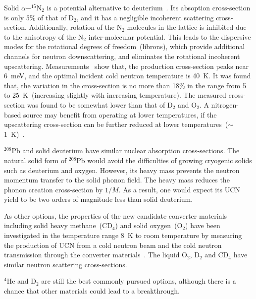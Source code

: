 Solid $\alpha - ^{15}$N$_2$ is a potential alternative to
deuterium~\cite{Salvat2013}. Its absoption cross-section is only 5\%
of that of D$_2$, and it has a negligible incoherent scattering
cross-section. Additionally, rotation of the N$_2$ molecules in the
lattice is inhibited due to the anisotropy of the N$_2$
inter-molecular potential. This leads to the dispersive modes for the
rotational degrees of freedom~(librons), which provide additional
channels for neutron downscattering, and eliminates the rotational
incoherent upscattering. Measurements~\cite{Salvat2013} show that, the
production cross-section peaks near 6~meV, and the optimal incident
cold neutron temperature is 40~K. It was found that, the variation in
the cross-section is no more than 18\% in the range from 5 to
25~K~(increasing slightly with increasing temperature). The measured
cross-section was found to be somewhat lower than that of D$_2$ and
O$_2$.
A nitrogen-based source may benefit from operating at lower
temperatures, if the upscattering cross-section can be further reduced
at lower temperatures~($\sim$1~K)~\cite{Salvat2013}.


$^{208}$Pb and solid deuterium have similar nuclear absorption
cross-sections. The natural solid form of $^{208}$Pb would avoid the
difficulties of growing cryogenic solids such as deuterium and
oxygen. However, its heavy mass prevents the neutron momentum transfer
to the solid phonon field. The heavy mass reduces the phonon creation
cross-section by $1/M$. As a result, one would expect its UCN yield to
be two orders of magnitude less than solid deuterium.

As other options, the properties of the new candidate converter
materials including solid heavy methane~(CD$_4$) and solid
oxygen~(O$_2$) have been investigated in the temperature range 8~K to
room temperature by measuring the production of UCN from a cold
neutron beam and the cold neutron transmission through the converter
materials~\cite{Atchison2009}. The liquid O$_2$, D$_2$ and CD$_4$ have
similar neutron scattering cross-sections.

$^4$He and D$_2$ are still the best commonly pursued options, although
there is a chance that other materials could lead to a breakthrough.



